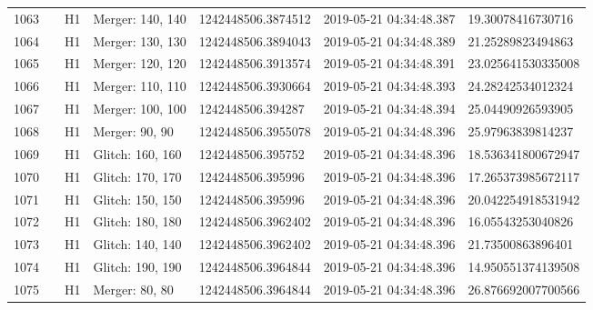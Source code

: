 \begin{longtable}{lllllll}
1063 &                                                    &       H1 &  Merger: 140, 140 &  1242448506.3874512 &  2019-05-21 04:34:48.387 &   19.30078416730716 \\
1064 &                                                    &       H1 &  Merger: 130, 130 &  1242448506.3894043 &  2019-05-21 04:34:48.389 &   21.25289823494863 \\
1065 &                                                    &       H1 &  Merger: 120, 120 &  1242448506.3913574 &  2019-05-21 04:34:48.391 &  23.025641530335008 \\
1066 &                                                    &       H1 &  Merger: 110, 110 &  1242448506.3930664 &  2019-05-21 04:34:48.393 &   24.28242534012324 \\
1067 &                                                    &       H1 &  Merger: 100, 100 &   1242448506.394287 &  2019-05-21 04:34:48.394 &   25.04490926593905 \\
1068 &                                                    &       H1 &    Merger: 90, 90 &  1242448506.3955078 &  2019-05-21 04:34:48.396 &   25.97963839814237 \\
1069 &                                                    &       H1 &  Glitch: 160, 160 &   1242448506.395752 &  2019-05-21 04:34:48.396 &  18.536341800672947 \\
1070 &                                                    &       H1 &  Glitch: 170, 170 &   1242448506.395996 &  2019-05-21 04:34:48.396 &  17.265373985672117 \\
1071 &                                                    &       H1 &  Glitch: 150, 150 &   1242448506.395996 &  2019-05-21 04:34:48.396 &  20.042254918531942 \\
1072 &                                                    &       H1 &  Glitch: 180, 180 &  1242448506.3962402 &  2019-05-21 04:34:48.396 &   16.05543253040826 \\
1073 &                                                    &       H1 &  Glitch: 140, 140 &  1242448506.3962402 &  2019-05-21 04:34:48.396 &   21.73500863896401 \\
1074 &                                                    &       H1 &  Glitch: 190, 190 &  1242448506.3964844 &  2019-05-21 04:34:48.396 &  14.950551374139508 \\
1075 &                                                    &       H1 &    Merger: 80, 80 &  1242448506.3964844 &  2019-05-21 04:34:48.396 &  26.876692007700566 \\

\end{longtable}
